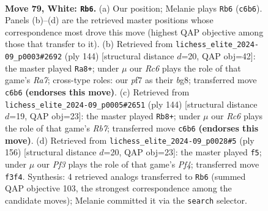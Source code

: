 \documentclass[11pt]{article}
\begin{document}
\clearpage

\begin{figure}[p]\centering
\begin{subfigure}{0.46\textwidth}\centering
\resizebox{\linewidth}{!}{%
\newchessgame
\chessboard[
  setfen={R7/4rp2/2R1p2k/8/P3P2K/5P2/8/8 w - - 49 79},
  showmover=false,
  pgfstyle=straightmove, color=movearrow, markmove={c6-b6}
]}
\caption{}
\end{subfigure}\hfill
\begin{subfigure}{0.46\textwidth}\centering
\resizebox{\linewidth}{!}{%
\newchessgame
\chessboard[
  setfen={3k2b1/R7/8/p4Pp1/4P3/5K2/8/r7 w - - 0 73},
  showmover=false,
  pgfstyle=straightmove, color=movearrow, markmove={a7-a8}
]}
\caption{}
\end{subfigure}
\\[4pt]
\begin{subfigure}{0.46\textwidth}\centering
\resizebox{\linewidth}{!}{%
\newchessgame
\chessboard[
  setfen={6k1/1R6/8/5Pp1/6P1/1p4K1/8/1r6 w - - 2 73},
  showmover=false,
  pgfstyle=straightmove, color=movearrow, markmove={b7-b8}
]}
\caption{}
\end{subfigure}\hfill
\begin{subfigure}{0.46\textwidth}\centering
\resizebox{\linewidth}{!}{%
\newchessgame
\chessboard[
  setfen={3k4/1R6/1p2p3/p3P1K1/1r3P2/8/8/8 w - - 8 79},
  showmover=false,
  pgfstyle=straightmove, color=movearrow, markmove={f4-f5}
]}
\caption{}
\end{subfigure}
\caption{\textbf{Move 79, White: \texttt{Rb6}.} (a) Our position; Melanie plays \texttt{Rb6} (\texttt{c6b6}). Panels (b)--(d) are the retrieved master positions whose correspondence most drove this move (highest QAP objective among those that transfer to it). (b) Retrieved from \texttt{lichess\_elite\_2024-09\_p0003\#2692} (ply 144) [structural distance $d$=20, QAP obj=42]: the master played \texttt{Ra8+}; under $\mu$ our \emph{Rc6} plays the role of that game's \emph{Ra7}; cross-type roles: our \emph{p}f7 as their \emph{b}g8; transferred move \texttt{c6b6} \textbf{(endorses this move)}. (c) Retrieved from \texttt{lichess\_elite\_2024-09\_p0005\#2651} (ply 144) [structural distance $d$=19, QAP obj=23]: the master played \texttt{Rb8+}; under $\mu$ our \emph{Rc6} plays the role of that game's \emph{Rb7}; transferred move \texttt{c6b6} \textbf{(endorses this move)}. (d) Retrieved from \texttt{lichess\_elite\_2024-09\_p0028\#5} (ply 156) [structural distance $d$=20, QAP obj=23]: the master played \texttt{f5}; under $\mu$ our \emph{Pf3} plays the role of that game's \emph{Pf4}; transferred move \texttt{f3f4}. Synthesis: 4 retrieved analogs transferred to \texttt{Rb6} (summed QAP objective 103, the strongest correspondence among the candidate moves); Melanie committed it via the \texttt{search} selector.}
\label{fig:thought-m156}
\end{figure}
\end{document}
